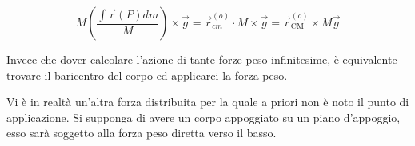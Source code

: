 \[
	M\left( \frac{\int\vec{r} (P)dm}{M} \right) \times \vec{g} = \vec{r}_{cm}^{(o)}\cdot M \times \vec{g} = \vec{r}_\text{CM}^{(o)} \times M\vec{g}
\]

Invece che dover calcolare l'azione di tante forze peso infinitesime,  è equivalente trovare il baricentro del corpo ed applicarci la forza peso.

Vi è in realtà un'altra forza distribuita per la quale a priori non è noto il punto di applicazione. Si supponga di avere un corpo appoggiato su un piano d'appoggio, esso sarà soggetto alla forza peso diretta verso il basso.

\begin{figure}[htpb]
	\centering


	\begin{tikzpicture}[x=0.75pt,y=0.75pt,yscale=-1,xscale=1]


\end{tikzpicture}
\end{figure}
